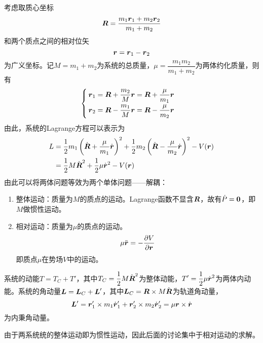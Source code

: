 考虑取质心坐标
\begin{equation}
	\boldsymbol{R} = \frac{m_1\boldsymbol{r}_1+m_2\boldsymbol{r}_2}{m_1+m_2}
\end{equation}
和两个质点之间的相对位矢
\begin{equation}
	\boldsymbol{r} = \boldsymbol{r}_1 - \boldsymbol{r}_2
\end{equation}
为广义坐标。记$M = m_1+m_2$为系统的{\heiti 总质量}，$\mu = \dfrac{m_1m_2}{m_1+m_2}$为两体{\heiti 约化质量}，则有
\begin{equation}
	\begin{cases}
		\displaystyle \boldsymbol{r}_1 = \boldsymbol{R} + \frac{m_2}{M}\boldsymbol{r} = \boldsymbol{R} + \frac{\mu}{m_1} \boldsymbol{r} \\[1.5ex]
		\displaystyle \boldsymbol{r}_2 = \boldsymbol{R} - \frac{m_1}{M}\boldsymbol{r} = \boldsymbol{R} - \frac{\mu}{m_2} \boldsymbol{r}
	\end{cases}
	\label{两体问题广义坐标变换}
\end{equation}
由此，系统的Lagrange方程可以表示为
\begin{align}
	L & = \frac12 m_1 \left(\dot{\boldsymbol{R}}+\frac{\mu}{m_1}\dot{\boldsymbol{r}}\right)^2 + \frac12 m_2 \left(\dot{\boldsymbol{R}}-\frac{\mu}{m_2}\dot{\boldsymbol{r}}\right)^2 - V(\boldsymbol{r}) \nonumber \\
	& = \frac12 M\dot{\boldsymbol{R}}^2 + \frac12 \mu \dot{\boldsymbol{r}}^2 - V(\boldsymbol{r})
\end{align}
由此可以将两体问题等效为两个单体问题——解耦：
\begin{enumerate}
	\item 整体运动：质量为$M$的质点的运动。Lagrange函数不显含$\boldsymbol{R}$，故有$\dot{P} = \boldsymbol{0}$，即$M$做惯性运动。
	\item 相对运动：质量为$\mu$的质点的运动。
	\begin{equation*}
		\mu \ddot{\boldsymbol{r}} = -\frac{\partial V}{\partial \boldsymbol{r}}
	\end{equation*}
	即质点$\mu$在势场$V$中的运动。
\end{enumerate}
系统的动能$T=T_C+T'$，其中$\displaystyle T_C = \frac12 M\dot{\boldsymbol{R}}^2$为整体动能，$\displaystyle T' = \frac12 \mu\dot{\boldsymbol{r}}^2$为两体内动能。系统的角动量$\boldsymbol{L} = \boldsymbol{L}_C+\boldsymbol{L}'$，其中$\boldsymbol{L}_C = \boldsymbol{R} \times M\dot{\boldsymbol{R}}$为轨道角动量，
\begin{equation*}
	\boldsymbol{L}' = \boldsymbol{r}'_1 \times m_1 \dot{\boldsymbol{r}}'_1 + \boldsymbol{r}'_2 \times m_2 \dot{\boldsymbol{r}}'_2 = \mu \boldsymbol{r} \times \dot{\boldsymbol{r}}
\end{equation*}
为内秉角动量。

由于两系统统的整体运动即为惯性运动，因此后面的讨论集中于相对运动的求解。

